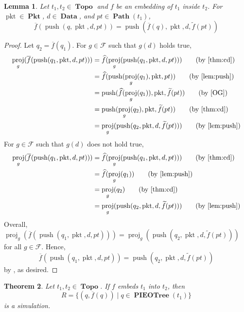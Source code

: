 \documentclass{amsart}
\makeatletter
\DeclareMathOperator{\pkt}{\mathrm{pkt}}
\DeclareMathOperator{\push}{\mathrm{push}}
\DeclareMathOperator{\proj}{\mathrm{proj}}
\DeclareMathOperator{\Pkt}{\mathbf{Pkt}}
\DeclareMathOperator{\Data}{\mathbf{Data}}
\DeclareMathOperator{\Topo}{\mathbf{Topo}}
\DeclareMathOperator{\Path}{\mathbf{Path}}
\DeclareMathOperator{\PIEOTree}{\mathbf{PIEOTree}}
\newtheorem{thm}{Theorem}[section]
\newtheorem{lem}[thm]{Lemma}
\theoremstyle{definition}
\newcommand{\leqnomode}{\tagsleft@true\let\veqno\@@leqno}
\makeatother
\begin{document}
\leqnomode

\begin{lem}
    \label{lem:sim3}
    Let $t_1, t_2 \in \Topo$ and $f$ be an embedding of $t_1$ inside $t_2$. 
    For $\pkt \in \Pkt$, $d \in \Data$, and $pt \in \Path(t_1)$,
    $$\overline{f}(\push(q, \pkt, d, pt)) = \push(\overline{f}(q), \pkt, d, \widetilde{f}(pt))$$
\end{lem}

\begin{proof}
    Let $q_2 = \overline{f}(q_1)$.
    For $g \in \mathcal F$ such that $g(d)$ holds true,
    \begin{align*}
        \proj_g(\overline{f}(\push(q_1, \pkt, d, pt)))
        &= \widehat{f}(\proj_g(\push(q_1, \pkt, d, pt))) \tag{by \Cref{thm:cd}}\\
        &= \widehat{f}(\push(\proj_g(q_1), \pkt, pt)) \tag{by \Cref{lem:push}}\\
        &= \push(\widehat{f}(\proj_g(q_1)), \pkt, \widetilde{f}(pt)) \tag{by \cite[Lemma ~5.9]{OG}}\\
        &= \push(\proj_g(q_2), \pkt, \widetilde{f}(pt)) \tag{by \Cref{thm:cd}}\\
        &= \proj_g(\push(q_2, \pkt, d, \widetilde{f}(pt))) \tag{by \Cref{lem:push}}
    \end{align*}
    For $g \in \mathcal F$ such that $g(d)$ does not hold true,
    \begin{align*}
        \proj_g(\overline{f}(\push(q_1, \pkt, d, pt)))
        &= \widehat{f}(\proj_g(\push(q_1, \pkt, d, pt))) \tag{by \Cref{thm:cd}}\\
        &= \widehat{f}(\proj_g(q_1)) \tag{by \Cref{lem:push}}\\
        &= \proj_g(q_2) \tag{by \Cref{thm:cd}}\\
        &= \proj_g(\push(q_2, \pkt, d, \widetilde{f}(pt))) \tag{by \Cref{lem:push}}
    \end{align*}
    Overall,
    $
        \proj_g(\overline{f}(\push(q_1, \pkt, d, pt)))
        = 
        \proj_g(\push(q_2, \pkt, d, \widetilde{f}(pt)))
    $
    for all $g \in \mathcal F$. 
    Hence,
    $$
        \overline{f}(\push(q_1, \pkt, d, pt))
        = 
        \push(q_2, \pkt, d, \widetilde{f}(pt))
    $$
    by , as desired.
\end{proof}

\begin{thm}
    Let $t_1, t_2 \in \Topo$. If $f$ embeds $t_1$ into $t_2$, then 
    $$R = \{(q, \overline{f}(q)) \mid q \in \PIEOTree(t_1)\}$$ 
    is a simulation.
\end{thm}
\end{document}
